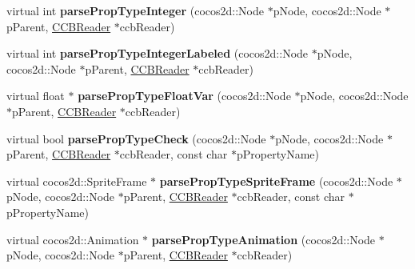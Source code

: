 \begin{DoxyCompactItemize}
\item 
\mbox{\label{classcocosbuilder_1_1NodeLoader_ab01f98b5f98cdc81281efc9548847c07}} 
virtual int {\bfseries parse\+Prop\+Type\+Integer} (cocos2d\+::\+Node $\ast$p\+Node, cocos2d\+::\+Node $\ast$p\+Parent, \hyperlink{classcocosbuilder_1_1CCBReader}{C\+C\+B\+Reader} $\ast$ccb\+Reader)
\item 
\mbox{\label{classcocosbuilder_1_1NodeLoader_a852d93fef8ef6af7404734e07852a6c8}} 
virtual int {\bfseries parse\+Prop\+Type\+Integer\+Labeled} (cocos2d\+::\+Node $\ast$p\+Node, cocos2d\+::\+Node $\ast$p\+Parent, \hyperlink{classcocosbuilder_1_1CCBReader}{C\+C\+B\+Reader} $\ast$ccb\+Reader)
\item 
\mbox{\label{classcocosbuilder_1_1NodeLoader_acf23f23a93155ed55d92e961c405622a}} 
virtual float $\ast$ {\bfseries parse\+Prop\+Type\+Float\+Var} (cocos2d\+::\+Node $\ast$p\+Node, cocos2d\+::\+Node $\ast$p\+Parent, \hyperlink{classcocosbuilder_1_1CCBReader}{C\+C\+B\+Reader} $\ast$ccb\+Reader)
\item 
\mbox{\label{classcocosbuilder_1_1NodeLoader_a5454ca4eda80f43b4dbc0cf26d19b650}} 
virtual bool {\bfseries parse\+Prop\+Type\+Check} (cocos2d\+::\+Node $\ast$p\+Node, cocos2d\+::\+Node $\ast$p\+Parent, \hyperlink{classcocosbuilder_1_1CCBReader}{C\+C\+B\+Reader} $\ast$ccb\+Reader, const char $\ast$p\+Property\+Name)
\item 
\mbox{\label{classcocosbuilder_1_1NodeLoader_a617e5b0241d5b96e999be537e108302b}} 
virtual cocos2d\+::\+Sprite\+Frame $\ast$ {\bfseries parse\+Prop\+Type\+Sprite\+Frame} (cocos2d\+::\+Node $\ast$p\+Node, cocos2d\+::\+Node $\ast$p\+Parent, \hyperlink{classcocosbuilder_1_1CCBReader}{C\+C\+B\+Reader} $\ast$ccb\+Reader, const char $\ast$p\+Property\+Name)
\item 
\mbox{\label{classcocosbuilder_1_1NodeLoader_acc9219d61cfcde96187725afc73f69ad}} 
virtual cocos2d\+::\+Animation $\ast$ {\bfseries parse\+Prop\+Type\+Animation} (cocos2d\+::\+Node $\ast$p\+Node, cocos2d\+::\+Node $\ast$p\+Parent, \hyperlink{classcocosbuilder_1_1CCBReader}{C\+C\+B\+Reader} $\ast$ccb\+Reader)
\item 

\end{DoxyCompactItemize}
